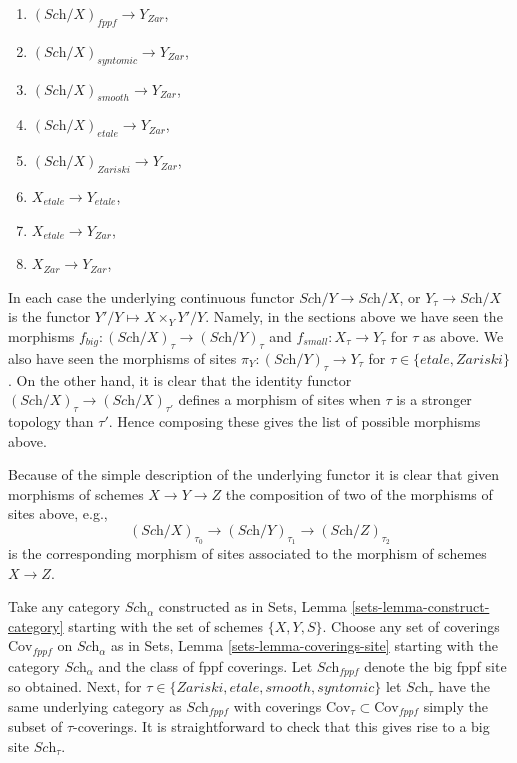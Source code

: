 \begin{enumerate}
\item $(\textit{Sch}/X)_{fppf} \longrightarrow Y_{Zar}$,
\item $(\textit{Sch}/X)_{syntomic} \longrightarrow Y_{Zar}$,
\item $(\textit{Sch}/X)_{smooth} \longrightarrow Y_{Zar}$,
\item $(\textit{Sch}/X)_{etale} \longrightarrow Y_{Zar}$,
\item $(\textit{Sch}/X)_{Zariski} \longrightarrow Y_{Zar}$,
\item $X_{etale} \longrightarrow Y_{etale}$,
\item $X_{etale} \longrightarrow Y_{Zar}$,
\item $X_{Zar} \longrightarrow Y_{Zar}$,
\end{enumerate}
In each case the underlying continuous functor
$\textit{Sch}/Y \to \textit{Sch}/X$, or
$Y_\tau \to \textit{Sch}/X$
is the functor $Y'/Y \mapsto X \times_Y Y'/Y$. Namely, in the sections
above we have seen the morphisms
$f_{big} : (\textit{Sch}/X)_\tau \to (\textit{Sch}/Y)_\tau$
and
$f_{small} : X_\tau \to Y_\tau$
for $\tau$ as above.
We also have seen the morphisms of sites
$\pi_Y : (\textit{Sch}/Y)_\tau \to Y_\tau$ for
$\tau \in \{etale, Zariski\}$.
On the other hand, it is clear that the identity functor
$(\textit{Sch}/X)_\tau \to (\textit{Sch}/X)_{\tau'}$ defines
a morphism of sites when $\tau$ is a stronger topology than
$\tau'$. Hence composing these gives the list of possible morphisms
above.

\medskip\noindent
Because of the simple description of the underlying functor it
is clear that given morphisms of schemes $X \to Y \to Z$ the
composition of two of the morphisms of sites above, e.g.,
$$
(\textit{Sch}/X)_{\tau_0} \longrightarrow
(\textit{Sch}/Y)_{\tau_1} \longrightarrow
(\textit{Sch}/Z)_{\tau_2}
$$
is the corresponding morphism of sites associated to the morphism
of schemes $X \to Z$.

\begin{remark}
\label{remark-choice-sites}
Take any category $\textit{Sch}_\alpha$ constructed as in
Sets, Lemma \ref{sets-lemma-construct-category}
starting with the set of schemes $\{X, Y, S\}$. Choose any set of
coverings $\text{Cov}_{fppf}$ on $\textit{Sch}_\alpha$ as in
Sets, Lemma \ref{sets-lemma-coverings-site}
starting with the category $\textit{Sch}_\alpha$ and the class of fppf
coverings. Let $\textit{Sch}_{fppf}$ denote the big fppf site so
obtained. Next, for $\tau \in \{Zariski, etale, smooth, syntomic\}$
let $\textit{Sch}_\tau$ have the same underlying category as
$\textit{Sch}_{fppf}$ with coverings
$\text{Cov}_\tau \subset \text{Cov}_{fppf}$ simply the subset of
$\tau$-coverings. It is straightforward to check that this gives rise
to a big site $\textit{Sch}_\tau$.
\end{remark}









